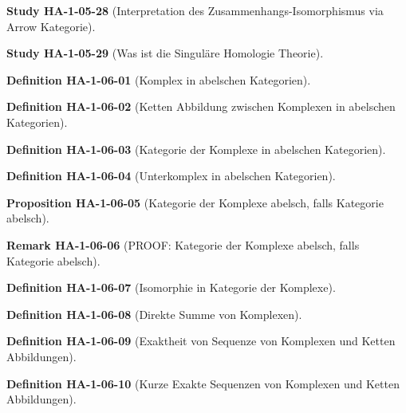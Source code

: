\documentclass[10pt, letterpaper]{article}
\newcommand{\CustomHeading}[3]{%
  \par\medskip\noindent%
  \textbf{#1 #2} \textnormal{(#3)}.\enskip%
}
\newenvironment{DEF}[2]{\CustomHeading{Definition}{#1}{#2}}{}
\newenvironment{PROP}[2]{\CustomHeading{Proposition}{#1}{#2}}{}
\newenvironment{REM}[2]{\CustomHeading{Remark}{#1}{#2}}{}
\newenvironment{STUD}[2]{\CustomHeading{Study}{#1}{#2}}{}
\begin{document}
\begin{STUD}{HA-1-05-28}{Interpretation des Zusammenhangs-Isomorphismus via Arrow Kategorie}
\end{STUD}

\begin{STUD}{HA-1-05-29}{Was ist die Singuläre Homologie Theorie}
\end{STUD}

\begin{DEF}{HA-1-06-01}{Komplex in abelschen Kategorien}
\end{DEF}

\begin{DEF}{HA-1-06-02}{Ketten Abbildung zwischen Komplexen in abelschen Kategorien}
\end{DEF}

\begin{DEF}{HA-1-06-03}{Kategorie der Komplexe in abelschen Kategorien}
\end{DEF}

\begin{DEF}{HA-1-06-04}{Unterkomplex in abelschen Kategorien}
\end{DEF}

\begin{PROP}{HA-1-06-05}{Kategorie der Komplexe abelsch, falls Kategorie abelsch}
\end{PROP}

\begin{REM}{HA-1-06-06}{PROOF: Kategorie der Komplexe abelsch, falls Kategorie abelsch}
\end{REM}

\begin{DEF}{HA-1-06-07}{Isomorphie in Kategorie der Komplexe}
\end{DEF}

\begin{DEF}{HA-1-06-08}{Direkte Summe von Komplexen}
\end{DEF}

\begin{DEF}{HA-1-06-09}{Exaktheit von Sequenze von Komplexen und Ketten Abbildungen}
\end{DEF}

\begin{DEF}{HA-1-06-10}{Kurze Exakte Sequenzen von Komplexen und Ketten Abbildungen}
\end{DEF}
\end{document}
